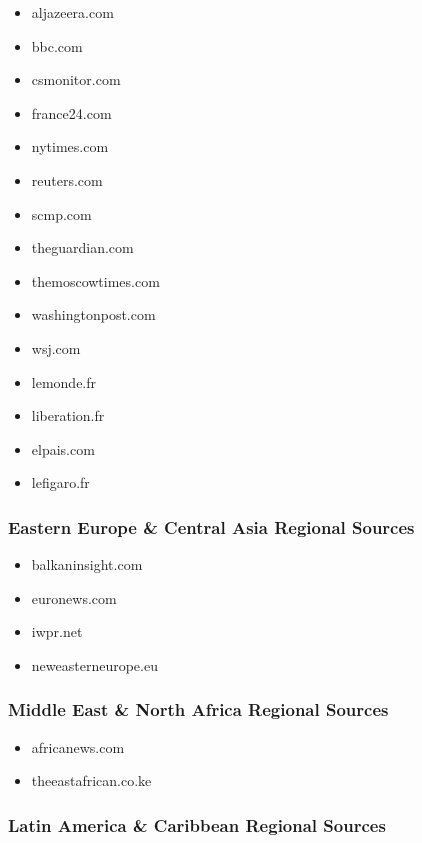 \documentclass[
  letterpaper,
  DIV=11,
  numbers=noendperiod]{scrartcl}
\providecommand{\tightlist}{%
  \setlength{\itemsep}{0pt}\setlength{\parskip}{0pt}}\usepackage{longtable,booktabs,array}
\begin{document}
\begin{itemize}
\tightlist
\item
  aljazeera.com
\item
  bbc.com
\item
  csmonitor.com
\item
  france24.com
\item
  nytimes.com
\item
  reuters.com
\item
  scmp.com
\item
  theguardian.com
\item
  themoscowtimes.com
\item
  washingtonpost.com
\item
  wsj.com
\item
  lemonde.fr
\item
  liberation.fr
\item
  elpais.com
\item
  lefigaro.fr
\end{itemize}

\subsubsection{Eastern Europe \& Central Asia Regional
Sources}\label{eastern-europe-central-asia-regional-sources}

\begin{itemize}
\tightlist
\item
  balkaninsight.com
\item
  euronews.com
\item
  iwpr.net
\item
  neweasterneurope.eu
\end{itemize}

\subsubsection{Middle East \& North Africa Regional
Sources}\label{middle-east-north-africa-regional-sources}

\begin{itemize}
\tightlist
\item
  africanews.com
\item
  theeastafrican.co.ke
\end{itemize}

\subsubsection{Latin America \& Caribbean Regional
Sources}\label{latin-america-caribbean-regional-sources}
\end{document}
